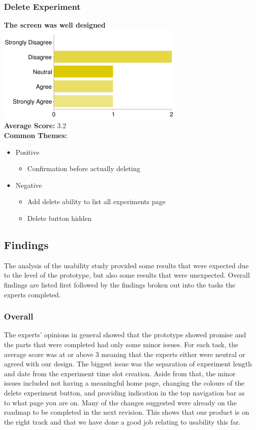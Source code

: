 \subsubsection{Delete Experiment}
\textbf{The screen was well designed}\\
\includegraphics[page=1,scale=0.65]{../other/usability-report-charts/delete_experiment_bar_chart}\\
\textbf{Average Score:} 3.2\\
\textbf{Common Themes:}
\begin{itemize}
\item Positive
\begin{itemize}
\item Confirmation before actually deleting
\end{itemize}
\item Negative
\begin{itemize}
\item Add delete ability to list all experiments page
\item Delete button hidden
\end{itemize}
\end{itemize}

\subsection{Findings}
The analysis of the usability study provided some results that were expected due to the level of the prototype, but also some results that were unexpected. Overall findings are listed first followed by the findings broken out into the tasks the experts completed.

\subsubsection{Overall}
The experts' opinions in general showed that the prototype showed promise and the parts that were completed had only some minor issues. For each task, the average score was at or above 3 meaning that the experts either were neutral or agreed with our design. The biggest issue was the separation of experiment length and date from the experiment time slot creation. Aside from that, the minor issues included not having a meaningful home page, changing the colours of the delete experiment button, and providing indication in the top navigation bar as to what page you are on. Many of the changes suggested were already on the roadmap to be completed in the next revision. This shows that our product is on the right track and that we have done a good job relating to usability this far.

